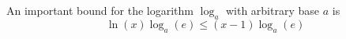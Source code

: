 An important bound for the logarithm $\log_a$ with arbitrary base $a$ is
$$\ln(x) \log_a(e) \leq (x-1) \log_a(e)$$ 
